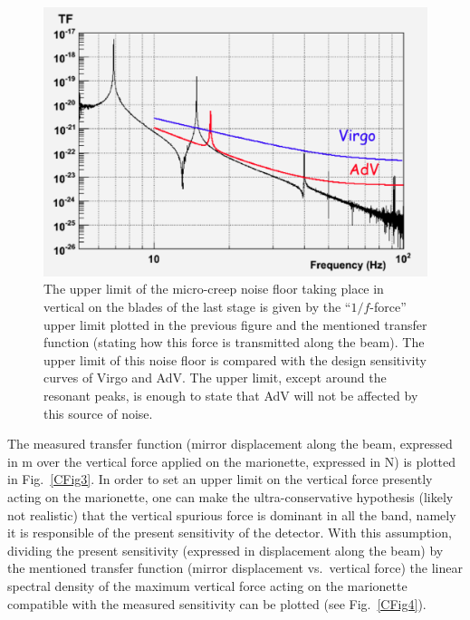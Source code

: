 \begin{figure}[t]
	\begin{center}
		\includegraphics[width=15cm]{./Sec_Suspensions/Figures/Creep-Fig5.pdf}
			\caption{The upper limit of the micro-creep noise floor taking place in vertical on the blades of the last stage is given by the ``$1/f$-force'' upper limit plotted in the previous figure and the mentioned transfer function (stating how this force is transmitted along the beam). The upper limit of this noise floor is compared with the design sensitivity curves of Virgo and AdV. The upper limit, except around the resonant peaks, is enough to state that AdV will not be affected by this source of noise.}
\label{CFig5}
	\end{center}
\end{figure}
The measured transfer function (mirror displacement along the beam, expressed in m over the vertical force applied on the marionette, expressed in N) is plotted in Fig.~\ref{CFig3}. In order to set an upper limit on the vertical force presently acting on the marionette, one can make the ultra-conservative hypothesis (likely not realistic) that the vertical spurious force is dominant in all the band, namely it is responsible of the present sensitivity of the detector. With this assumption, dividing the present sensitivity (expressed in displacement along the beam) by the mentioned transfer function (mirror displacement vs.\ vertical force) the linear spectral density of the maximum vertical force acting on the marionette compatible with the measured sensitivity can be plotted (see Fig.~\ref{CFig4}). 
